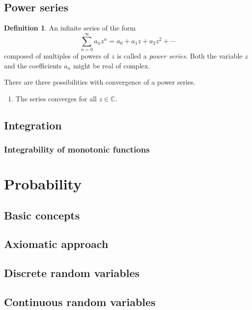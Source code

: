 \documentclass[12pt]{book}
\newcommand{\CC}{\mathbb C}
\theoremstyle{definition}
\newtheorem{definition}{Definition}[section]
\theoremstyle{remark}
\begin{document}
		\section{Power series}
			\begin{definition}
				An infinite series of the form
				\begin{equation*}
					\sum_{n = 0}^{\infty} a_n z^n = a_0 + a_1 z + a_2 z^2 + \cdots
				\end{equation*}
				composed of multiples of powers of $z$ is called a \textit{power series}. Both the variable $z$ and the coefficients $a_n$ might be real of complex.
			\end{definition}
			There are three possibilities with convergence of a power series.
			\begin{enumerate}
				\item The series converges for all $z \in \CC$.
				
			\end{enumerate}
		

		
		\section{Integration}
			\subsection{Integrability of monotonic functions}
	
	\chapter{Probability}
		\section{Basic concepts}
		
		\section{Axiomatic approach}
		
		\section{Discrete random variables}
		
		\section{Continuous random variables}
		
\end{document}
